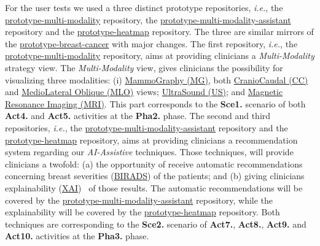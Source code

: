 For the user tests we used a three distinct prototype repositories, \textit{i.e.}, the \hyperlink{https://github.com/MIMBCD-UI/prototype-multi-modality}{prototype-multi-modality} repository, the \hyperlink{https://github.com/mida-project/prototype-multi-modality-assistant}{prototype-multi-modality-assistant} repository and the \hyperlink{https://github.com/mida-project/prototype-heatmap}{prototype-heatmap} repository. The three are similar mirrors of the \hyperlink{https://github.com/MIMBCD-UI/prototype-breast-cancer}{prototype-breast-cancer} with major changes. The first repository, \textit{i.e.}, the \hyperlink{https://github.com/MIMBCD-UI/prototype-multi-modality}{prototype-multi-modality} repository, aims at providing clinicians a \textit{Multi-Modality} strategy view. The \textit{Multi-Modality} view, gives clinicians the possibility for visualizing three modalities: (i) \hyperlink{https://medical-dictionary.thefreedictionary.com/mammography}{MammoGraphy (MG)}, both \hyperlink{https://medical-dictionary.thefreedictionary.com/craniocaudal}{CranioCaudal (CC)} and \hyperlink{https://www.thefreedictionary.com/mediolateral}{MedioLateral Oblique (MLO)} views; \hyperlink{https://www.thefreedictionary.com/UltraSound}{UltraSound (US)}; and \hyperlink{https://www.thefreedictionary.com/Magnetic+Resonance+Imaging}{Magnetic Resonance Imaging (MRI)}. This part corresponds to the \textbf{Sce1.} scenario of both \textbf{Act4.} and \textbf{Act5.} activities at the \textbf{Pha2.} phase. The second and third repositories, \textit{i.e.}, the \hyperlink{https://github.com/mida-project/prototype-multi-modality-assistant}{prototype-multi-modality-assistant} repository and the \hyperlink{https://github.com/mida-project/prototype-heatmap}{prototype-heatmap} repository, aims at providing clinicians a recommendation system regarding our \textit{AI-Assistive} techniques. Those techniques, will provide clinicians a twofold: (a) the opportunity of receive automatic recommendations concerning breast severities (\hyperlink{https://en.wikipedia.org/wiki/BI-RADS}{BIRADS}) of the patients; and (b) giving clinicians explainability (\hyperlink{https://www.darpa.mil/program/explainable-artificial-intelligence}{XAI})~\cite{gunning2017explainable, holzinger2017we} of those results. The automatic recommendations will be covered by the \hyperlink{https://github.com/mida-project/prototype-multi-modality-assistant}{prototype-multi-modality-assistant} repository, while the explainability will be covered by the \hyperlink{https://github.com/mida-project/prototype-heatmap}{prototype-heatmap} repository. Both techniques are corresponding to the \textbf{Sce2.} scenario of \textbf{Act7.}, \textbf{Act8.}, \textbf{Act9.} and \textbf{Act10.} activities at the \textbf{Pha3.} phase.